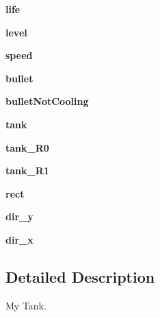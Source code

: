 \begin{DoxyCompactItemize}
\item 
\mbox{\label{classmy_tank_1_1_my_tank_af3c3d42630d497c0c1b4ed54445127b1}} 
{\bfseries life}
\item 
\mbox{\label{classmy_tank_1_1_my_tank_a28f519ca49d0db603c8ddb3f1453ec75}} 
{\bfseries level}
\item 
\mbox{\label{classmy_tank_1_1_my_tank_a441f432185fb0054f5284cc7e903f30d}} 
{\bfseries speed}
\item 
\mbox{\label{classmy_tank_1_1_my_tank_a0ada7bcbd663f19527fa76e16f4d3c9e}} 
{\bfseries bullet}
\item 
\mbox{\label{classmy_tank_1_1_my_tank_ab4938d624383575b76007be5632aeca7}} 
{\bfseries bullet\+Not\+Cooling}
\item 
\mbox{\label{classmy_tank_1_1_my_tank_a3a9249e8f9c7a89de9e47e640967e9a1}} 
{\bfseries tank}
\item 
\mbox{\label{classmy_tank_1_1_my_tank_a4c536e882ddcea172f68acb2a9331b61}} 
{\bfseries tank\+\_\+\+R0}
\item 
\mbox{\label{classmy_tank_1_1_my_tank_ad7cf070d23f432c894a8a52a46614425}} 
{\bfseries tank\+\_\+\+R1}
\item 
\mbox{\label{classmy_tank_1_1_my_tank_a39869d0420aaf778d68a29825b585c93}} 
{\bfseries rect}
\item 
\mbox{\label{classmy_tank_1_1_my_tank_a067bb58102da3bce44421725e4d30706}} 
{\bfseries dir\+\_\+y}
\item 
\mbox{\label{classmy_tank_1_1_my_tank_a6a4c0da0764b80bcd61b7e752821d7f0}} 
{\bfseries dir\+\_\+x}
\end{DoxyCompactItemize}


\subsection{Detailed Description}
My Tank. 

